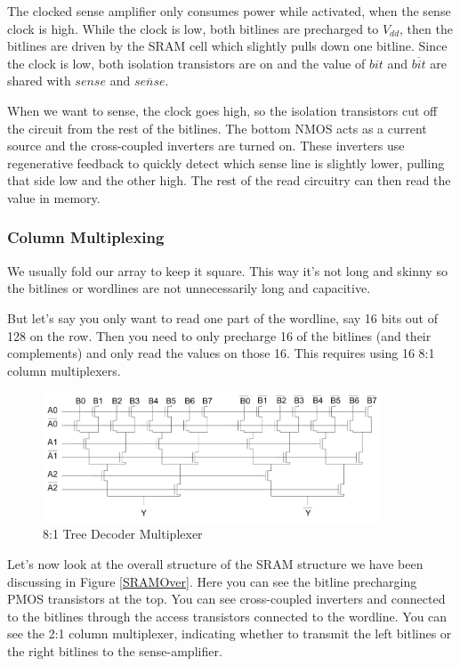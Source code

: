 \documentclass{article}
\begin{document}
The clocked sense amplifier only consumes power while activated, when the sense clock is high. While the clock is low, both bitlines are precharged to $V_{dd}$, then the bitlines are driven by the SRAM cell which slightly pulls down one bitline. Since the clock is low, both isolation transistors are on and the value of $bit$ and $\overline{bit}$ are shared with $sense$ and $\overline{sense}$. 

When we want to sense, the clock goes high, so the isolation transistors cut off the circuit from the rest of the bitlines. The bottom NMOS acts as a current source and the cross-coupled inverters are turned on. These inverters use regenerative feedback to quickly detect which sense line is slightly lower, pulling that side low and the other high. The rest of the read circuitry can then read the value in memory. 

\subsubsection{Column Multiplexing}

We usually fold our array to keep it square. This way it's not long and skinny so the bitlines or wordlines are not unnecessarily long and capacitive. 

But let's say you only want to read one part of the wordline, say 16 bits out of 128 on the row. Then you need to only precharge 16 of the bitlines (and their complements) and only read the values on those 16. This requires using 16 8:1 column multiplexers.

 \begin{figure}[ht!]
\centering
\includegraphics[width=100mm]{Mux.png}
\caption{8:1 Tree Decoder Multiplexer}
\end{figure}

Let's now look at the overall structure of the SRAM structure we have been discussing in Figure \ref{SRAMOver}. Here you can see the bitline precharging PMOS transistors at the top. You can see cross-coupled inverters and connected to the bitlines through the access transistors connected to the wordline. You can see the 2:1 column multiplexer, indicating whether to transmit the left bitlines or the right bitlines to the sense-amplifier. 
\end{document}

